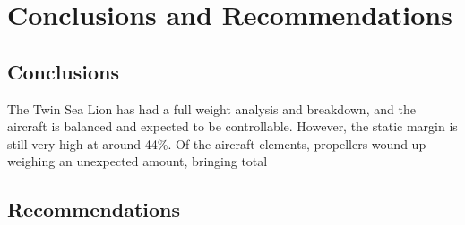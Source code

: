 \documentclass[conf]{new-aiaa}
\begin{document}

\section{Conclusions and Recommendations}
\subsection{Conclusions}
The Twin Sea Lion has had a full weight analysis and breakdown, and the aircraft is balanced and expected to be controllable. However, the static margin is still very high at around 44\%. Of the aircraft elements, propellers wound up weighing an unexpected amount, bringing total 

\subsection{Recommendations}
\end{document}
